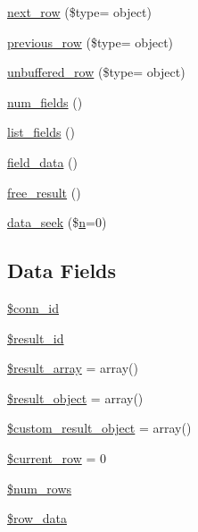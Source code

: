 \begin{DoxyCompactItemize}
\item 
\hyperlink{class_c_i___d_b__result_a2f889a20a40a759eae8da377a5a7e95d}{next\+\_\+row} (\$type= \textquotesingle{}object\textquotesingle{})
\item 
\hyperlink{class_c_i___d_b__result_a82714fea11fb63d96343d164f3a536b7}{previous\+\_\+row} (\$type= \textquotesingle{}object\textquotesingle{})
\item 
\hyperlink{class_c_i___d_b__result_a98fc250819928e1cd90798225379691e}{unbuffered\+\_\+row} (\$type= \textquotesingle{}object\textquotesingle{})
\item 
\hyperlink{class_c_i___d_b__result_af831bf363e4d7d661a717a4932af449d}{num\+\_\+fields} ()
\item 
\hyperlink{class_c_i___d_b__result_a50b54eb4ea7cfd039740f532988ea776}{list\+\_\+fields} ()
\item 
\hyperlink{class_c_i___d_b__result_a84bffd65e53902ade1591716749a33e3}{field\+\_\+data} ()
\item 
\hyperlink{class_c_i___d_b__result_aad2d98d6beb3d6095405356c6107b473}{free\+\_\+result} ()
\item 
\hyperlink{class_c_i___d_b__result_a8255ae91816e4206e29eb7581c5af0f1}{data\+\_\+seek} (\$\hyperlink{cli_2error__general_8php_ace0fd03cd383f20ce6ea63247a207294}{n}=0)
\end{DoxyCompactItemize}
\subsection*{Data Fields}
\begin{DoxyCompactItemize}
\item 
\hyperlink{class_c_i___d_b__result_a16c23f1dcbfed2f2759f5e54f604106d}{\$conn\+\_\+id}
\item 
\hyperlink{class_c_i___d_b__result_a0ebacb40e3b6f8bf33d3de0f2cc71474}{\$result\+\_\+id}
\item 
\hyperlink{class_c_i___d_b__result_a153392b3ec395131d32c70cda855698e}{\$result\+\_\+array} = array()
\item 
\hyperlink{class_c_i___d_b__result_aa292cbb3dbb8c654cb4f6c61f250efd3}{\$result\+\_\+object} = array()
\item 
\hyperlink{class_c_i___d_b__result_a680c2e11eeb189d9bb8ba2a552766b7b}{\$custom\+\_\+result\+\_\+object} = array()
\item 
\hyperlink{class_c_i___d_b__result_a2ec3a266ee95cda75cdbb71bc9ee1b53}{\$current\+\_\+row} = 0
\item 
\hyperlink{class_c_i___d_b__result_ac926549b713e71c5f5fd63999cebfb8c}{\$num\+\_\+rows}
\item 
\hyperlink{class_c_i___d_b__result_a335b4c27a1529df9e484e044e470ec07}{\$row\+\_\+data}
\end{DoxyCompactItemize}
